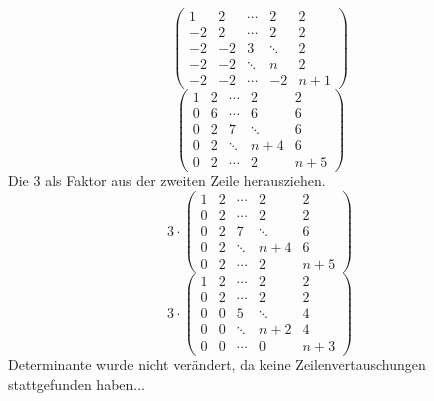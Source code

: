 \documentclass{article} %
\begin{document}
\[
\begin{pmatrix}
    1 & 2 & \cdots & 2 & 2  \\
   -2 & 2 & \cdots & 2 & 2 \\
   -2 & -2 & 3 & \ddots & 2 \\
   -2 & -2 & \ddots & n & 2 \\
   -2 & -2 & \cdots & -2 & n+1 
\end{pmatrix}
\]
\[
\begin{pmatrix}
    1 & 2 & \cdots & 2 & 2  \\
   0 & 6 & \cdots & 6 & 6 \\
   0 & 2 & 7 & \ddots & 6 \\
   0 & 2 & \ddots & n+4 & 6 \\
   0 & 2 & \cdots & 2 & n+5 
\end{pmatrix}
\]
Die 3 als Faktor aus der zweiten Zeile herausziehen.
\[
3 \cdot \begin{pmatrix}
    1 & 2 & \cdots & 2 & 2  \\
   0 & 2 & \cdots & 2 & 2 \\
   0 & 2 & 7 & \ddots & 6 \\
   0 & 2 & \ddots & n+4 & 6 \\
   0 & 2 & \cdots & 2 & n+5 
\end{pmatrix}
\]
 \[
3 \cdot \begin{pmatrix}
    1 & 2 & \cdots & 2 & 2  \\
   0 & 2 & \cdots & 2 & 2 \\
   0 & 0 & 5 & \ddots & 4 \\
   0 & 0 & \ddots & n+2 & 4 \\
   0 & 0 & \cdots & 0 & n+3 
\end{pmatrix}
\]
Determinante wurde nicht verändert, da keine Zeilenvertauschungen stattgefunden haben...
\end{document}
